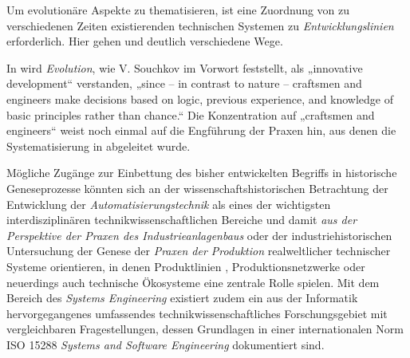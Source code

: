 \documentclass[11pt,a4paper]{article}
\begin{document}
Um evolutionäre Aspekte zu thematisieren, ist eine Zuordnung von zu
verschiedenen Zeiten existierenden technischen Systemen zu
\emph{Entwicklungslinien} erforderlich. Hier gehen \cite{Shpakovsky2010} und
\cite{TESE2018} deutlich verschiedene Wege.

In \cite{TESE2018} wird \emph{Evolution}, wie V. Souchkov im Vorwort
\cite[S. IX]{TESE2018} feststellt, als „innovative development“ verstanden,
„since -- in contrast to nature -- craftsmen and engineers make decisions
based on logic, previous experience, and knowledge of basic principles rather
than chance.“ Die Konzentration auf „craftsmen and engineers“ weist noch
einmal auf die Engführung der Praxen hin, aus denen die Systematisierung in
\cite{TESE2018} abgeleitet wurde.

Mögliche Zugänge zur Einbettung des bisher entwickelten Begriffs in
historische Geneseprozesse könnten sich an der wissenschaftshistorischen
Betrachtung \cite{Weller2008} der Entwicklung der
\emph{Automatisierungstechnik} als eines der wichtigsten interdisziplinären
technikwissenschaftlichen Bereiche und damit \emph{aus der Perspektive der
  Praxen des Industrieanlagenbaus} oder der industriehistorischen Untersuchung
der Genese der \emph{Praxen der Produktion} realweltlicher technischer Systeme
orientieren, in denen Produktlinien \cite{Pohl2005}, Produktionsnetzwerke
\cite{Friedli2013} oder neuerdings auch technische Ökosysteme
\cite{Graebe2018} eine zentrale Rolle spielen. Mit dem Bereich des
\emph{Systems Engineering} existiert zudem ein aus der Informatik
hervorgegangenes umfassendes technikwissenschaftliches Forschungsgebiet mit
vergleichbaren Fragestellungen, dessen Grundlagen in einer internationalen
Norm ISO 15288 \emph{Systems and Software Engineering} dokumentiert sind.
\end{document}
